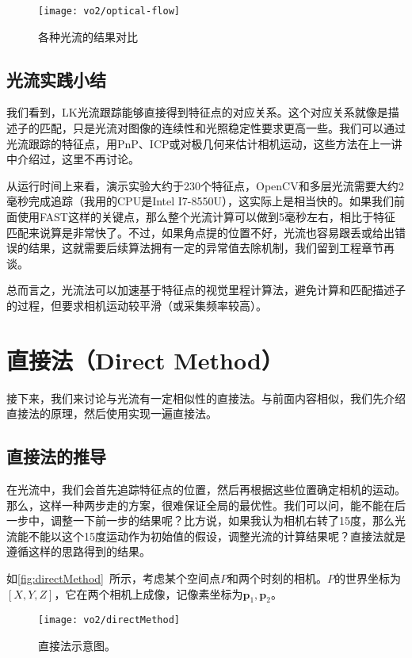 \begin{figure}[!htp]
	\centering
	\texttt{[image: vo2/optical-flow]}
	\caption{各种光流的结果对比}
	\label{fig:optical-flow-result}
\end{figure}

\subsection{光流实践小结}
我们看到，LK光流跟踪能够直接得到特征点的对应关系。这个对应关系就像是描述子的匹配，只是光流对图像的连续性和光照稳定性要求更高一些。我们可以通过光流跟踪的特征点，用PnP、ICP或对极几何来估计相机运动，这些方法在上一讲中介绍过，这里不再讨论。

从运行时间上来看，演示实验大约于230个特征点，OpenCV和多层光流需要大约2毫秒完成追踪（我用的CPU是Intel I7-8550U），这实际上是相当快的。如果我们前面使用FAST这样的关键点，那么整个光流计算可以做到5毫秒左右，相比于特征匹配来说算是非常快了。不过，如果角点提的位置不好，光流也容易跟丢或给出错误的结果，这就需要后续算法拥有一定的异常值去除机制，我们留到工程章节再谈。

总而言之，光流法可以加速基于特征点的视觉里程计算法，避免计算和匹配描述子的过程，但要求相机运动较平滑（或采集频率较高）。

\section{直接法（Direct Method）}
接下来，我们来讨论与光流有一定相似性的直接法。与前面内容相似，我们先介绍直接法的原理，然后使用实现一遍直接法。

\subsection{直接法的推导}
在光流中，我们会首先追踪特征点的位置，然后再根据这些位置确定相机的运动。那么，这样一种两步走的方案，很难保证全局的最优性。我们可以问，能不能在后一步中，调整一下前一步的结果呢？比方说，如果我认为相机右转了15度，那么光流能不能以这个15度运动作为初始值的假设，调整光流的计算结果呢？直接法就是遵循这样的思路得到的结果。

如\autoref{fig:directMethod}~所示，考虑某个空间点$P$和两个时刻的相机。$P$的世界坐标为$[X,Y,Z]$，它在两个相机上成像，记像素坐标为$\bm{p}_1, \bm{p}_2$。

\begin{figure}[!htp]
	\centering
	\texttt{[image: vo2/directMethod]}
	\caption{直接法示意图。}
	\label{fig:directMethod}
\end{figure}

